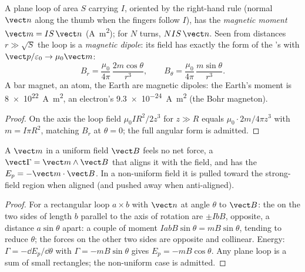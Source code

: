 \begin{definition}\label{def:b1:magnetostatics:moment}
A plane loop of area $S$ carrying $I$, oriented by the right-hand rule
(normal $\vect n$ along the thumb when the fingers follow $I$), has the
\emph{magnetic moment} $\vect m = IS\,\vect n$ (\unit{A.m^2}); for $N$
turns, $NIS\,\vect n$. Seen from distances $r \gg \sqrt S$ the loop is a
\emph{magnetic dipole}: its field has exactly the form of the 's with $\vect p/\varepsilon_0 \to \mu_0\vect m$:
\[
B_r = \frac{\mu_0}{4\pi}\,\frac{2m\cos\theta}{r^3}, \qquad
B_\theta = \frac{\mu_0}{4\pi}\,\frac{m\sin\theta}{r^3} .
\]
A bar magnet, an atom, the Earth are magnetic dipoles: the Earth's
moment is \qty{8e22}{A.m^2}, an electron's \qty{9.3e-24}{A.m^2} (the
Bohr magneton).
\end{definition}

\begin{proof}
On the axis the loop field $\mu_0IR^2/2z^3$ for $z \gg R$ equals
$\mu_0 \cdot 2m/4\pi z^3$ with $m = I\pi R^2$, matching $B_r$ at $\theta = 0$;
the full angular form is admitted.
\end{proof}

\begin{theorem}\label{thm:b1:magnetostatics:dipoleinfield}
A  $\vect m$ in a uniform field $\vect B$ feels no net
force, a  $\vect\Gamma = \vect m\wedge\vect B$ that aligns it with
the field, and has the  $E_p = -\vect m\cdot\vect B$. In a
non-uniform field it is pulled toward the strong-field region when
aligned (and pushed away when anti-aligned).
\end{theorem}

\begin{proof}
For a rectangular loop $a \times b$ with $\vect n$ at angle $\theta$ to
$\vect B$: the  on the two sides of length $b$ parallel to
the axis of rotation are $\pm IbB$, opposite, a distance $a\sin\theta$
apart: a couple of moment $IabB\sin\theta = mB\sin\theta$, tending to
reduce $\theta$; the forces on the other two sides are opposite and
collinear. Energy: $\Gamma = -\dd E_p/\dd\theta$ with $\Gamma = -mB\sin\theta$
gives $E_p = -mB\cos\theta$. Any plane loop is a sum of small rectangles;
the non-uniform case is admitted.
\end{proof}

